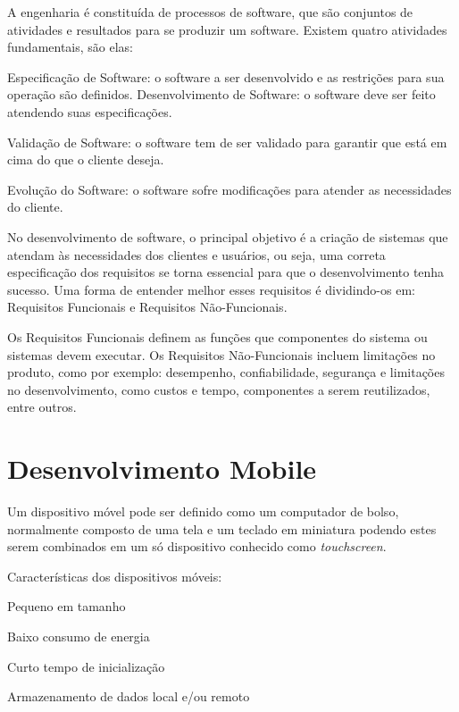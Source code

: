 A engenharia é constituída de processos de software, que são conjuntos de atividades e resultados para se produzir um software. Existem quatro atividades fundamentais, são elas: 
\begin{alineascomponto}

\item Especificação de Software: o software a ser desenvolvido e as restrições para sua operação são definidos. 
Desenvolvimento de Software: o software deve ser feito atendendo suas especificações.
\item Validação de Software: o software tem de ser validado para garantir que está em cima do que o cliente deseja. 
\item Evolução do Software: o software sofre modificações para atender as necessidades do cliente. \cite{somm}
\end{alineascomponto}

No desenvolvimento de software, o principal objetivo é a criação de sistemas que atendam às necessidades dos clientes e usuários, ou seja, uma correta especificação dos requisitos se torna essencial para que o desenvolvimento tenha sucesso. Uma forma de entender melhor esses requisitos é dividindo-os em: Requisitos Funcionais e Requisitos Não-Funcionais. 


Os Requisitos Funcionais definem as funções que componentes do sistema ou sistemas devem executar. 
Os Requisitos Não-Funcionais incluem limitações no produto, como por exemplo: desempenho, confiabilidade, segurança e limitações no desenvolvimento, como custos e tempo, componentes a serem reutilizados, entre outros. \cite{vac}

\section{Desenvolvimento Mobile}
\label{sec:desenvolvimento-mobile}

Um dispositivo móvel pode ser definido como um computador de bolso, normalmente composto de uma tela e um teclado em miniatura podendo estes serem combinados em um só dispositivo conhecido como \textit{ touchscreen}.

Características dos dispositivos móveis:

\begin{alineascomponto}
 
\item Pequeno em tamanho
\item Baixo consumo de energia
\item Curto tempo de inicialização
\item Armazenamento de dados local e/ou remoto

	\end{alineascomponto}


